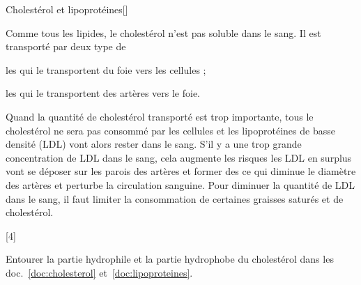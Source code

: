 \begin{doc}{Cholestérol et lipoprotéines}[\label{doc:lipoproteines}]
  \begin{figure}
    \vspace*{-34pt}
    \centering

  \end{figure}
  
  Comme tous les lipides, le cholestérol n'est pas soluble dans le sang.
  Il est transporté par deux type de 
  \begin{listePoints}
    \item les  qui le transportent du foie vers les cellules ;
    \item les  qui le transportent des artères vers le foie.
  \end{listePoints}

  Quand la quantité de cholestérol transporté est trop importante, tous le cholestérol ne sera pas consommé par les cellules et les lipoprotéines de basse densité (LDL) vont alors rester dans le sang.
  S'il y a une trop grande concentration de LDL dans le sang, cela augmente les risques  les LDL en surplus vont se déposer sur les parois des artères et former des  ce qui diminue le diamètre des artères et perturbe la circulation sanguine.
  Pour diminuer la quantité de LDL dans le sang, il faut limiter la consommation de certaines graisses saturés et de cholestérol.
\end{doc}

[4]

\schematiser
Entourer la partie hydrophile et la partie hydrophobe du cholestérol dans les doc.~\ref{doc:cholesterol} et~\ref{doc:lipoproteines}.
